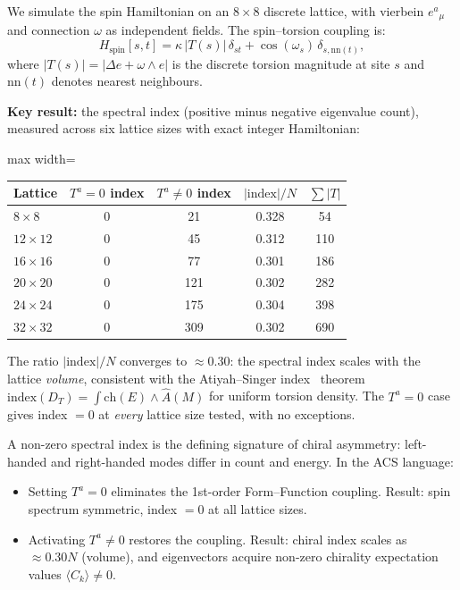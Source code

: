 \documentclass[12pt,a4paper]{article}
\theoremstyle{plain}
\theoremstyle{definition}
\theoremstyle{remark}
\begin{document}
We simulate the spin Hamiltonian on an $8 \times 8$ discrete lattice, 
with vierbein $e^a{}_\mu$ and connection $\omega$ as independent fields.  
The spin--torsion coupling is:
\begin{equation}
  H_{\mathrm{spin}}[s,t] = \kappa\,|T(s)|\,\delta_{st} + \cos(\omega_s)\,\delta_{s,\mathrm{nn}(t)},
\end{equation}
where $|T(s)| = |\Delta e + \omega \wedge e|$ is the discrete torsion magnitude 
at site $s$ and $\mathrm{nn}(t)$ denotes nearest neighbours.

\textbf{Key result:} the spectral index (positive minus negative eigenvalue count), 
measured across six lattice sizes with exact integer Hamiltonian:
\begin{center}
\begin{adjustbox}{max width=\linewidth}\begin{tabular}{lcccc}
\toprule
Lattice & $T^a = 0$ index & $T^a \neq 0$ index & $|\mathrm{index}|/N$ & $\sum|T|$ \\
\midrule
$8 \times 8$ & 0 & 21 & 0.328 & 54 \\
$12 \times 12$ & 0 & 45 & 0.312 & 110 \\
$16 \times 16$ & 0 & 77 & 0.301 & 186 \\
$20 \times 20$ & 0 & 121 & 0.302 & 282 \\
$24 \times 24$ & 0 & 175 & 0.304 & 398 \\
$32 \times 32$ & 0 & 309 & 0.302 & 690 \\
\bottomrule
\end{tabular}\end{adjustbox}
\end{center}

The ratio $|\mathrm{index}|/N$ converges to $\approx 0.30$: the spectral index 
scales with the lattice \emph{volume}, consistent with the Atiyah--Singer index~\cite{AtiyahSinger1963} 
theorem $\mathrm{index}(D_T) = \int \mathrm{ch}(E) \wedge \hat{A}(M)$ for 
uniform torsion density.  The $T^a = 0$ case gives index $= 0$ at \emph{every} 
lattice size tested, with no exceptions.

A non-zero spectral index is the defining signature of chiral asymmetry: 
left-handed and right-handed modes differ in count and energy.  
In the ACS language:
\begin{itemize}[noitemsep]
  \item Setting $T^a = 0$ eliminates the 1st-order Form--Function coupling.  
    Result: spin spectrum symmetric, index $= 0$ at all lattice sizes.
  \item Activating $T^a \neq 0$ restores the coupling.  
    Result: chiral index scales as $\approx 0.30 N$ (volume), and eigenvectors 
    acquire non-zero chirality expectation values $\langle C_k \rangle \neq 0$.
\end{itemize}
\end{document}
